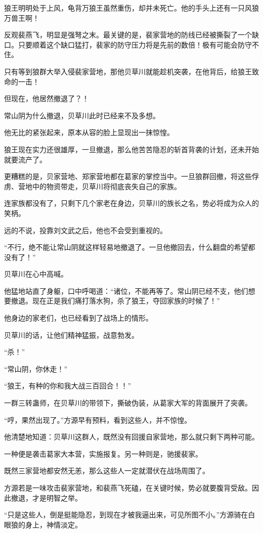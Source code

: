 \begin{this_body}
狼王明明处于上风，龟背万狼王虽然重伤，却并未死亡。他的手头上还有一只风狼万兽王啊！

反观裴燕飞，明显是强弩之末。最关键的是，裴家营地的防线已经被撕裂了一个缺口。只要顺着这个缺口猛打，裴家的防守压力将是先前的数倍！极有可能会防守不住。

只有等到狼群大举入侵裴家营地，那他贝草川就能趁机突袭，在他背后，给狼王致命的一击！

但现在，他居然撤退了？！

常山阴为什么撤退，贝草川此时已经来不及多想。

他无比的紧张起来，原本从容的脸上显现出一抹惊惶。

狼王现在实力还很雄厚，一旦撤退，那么他苦苦隐忍的斩首背袭的计划，还未开始就要流产了。

更糟糕的是，贝家营地、郑家营地都在葛家的掌控当中。一旦狼群回撤，将这些俘虏、营地中的物资带走，贝草川将彻底丧失自己的家族。

连家族都没有了，只剩下几个家老在身边，贝草川的族长之名，势必将成为众人的笑柄。

远的不说，投靠刘文武之后，他也不会受到重视的。

“不行，绝不能让常山阴就这样轻易地撤退了。一旦他撤回去，什么翻盘的希望都没有了！”

贝草川在心中高喊。

他猛地站直了身躯，口中呼喝道：“诸位，不能再等了。常山阴已经不支，他们想要撤退。现在正是我们痛打落水狗，杀了狼王，夺回家族的时候了！”

他身边的家老们，也已经看到了战场上的情形。

贝草川的话，让他们精神猛振，战意勃发。

“杀！”

“常山阴，你休走！”

“狼王，有种的你和我大战三百回合！！”

一群三转蛊师，在贝草川的带领下，撕破伪装，从葛家大军的背面展开了突袭。

“哼，果然出现了。”方源早有预料，看到这些人，并不惊惶。

他清楚地知道：贝草川这群人，既然没有回援自家营地，那么就只剩下两种可能。

一种便是袭击葛家大本营，实施报复。另一种则是，驰援裴家。

既然三家营地都安然无恙，那么这些人一定就潜伏在战场周围了。

方源若是一味攻击裴家营地，和裴燕飞死磕，在关键时候，势必就要腹背受敌。因此撤退，才是明智之举。

“只是这些人，倒是挺能隐忍，到现在才被我逼出来，可见所图不小。”方源骑在白眼狼的身上，神情淡定。


\end{this_body}
